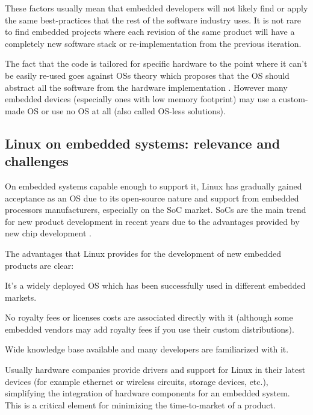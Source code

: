 These factors usually mean that embedded developers will not likely find or apply the same best-practices that the rest of the software industry uses. It is not rare to find embedded projects where each revision of the same product will have a completely new software stack or re-implementation from the previous iteration.

The fact that the code is tailored for specific hardware to the point where it can't be easily re-used goes against \acp{OS} theory which proposes that the \ac{OS} should abstract all the software from the hardware implementation \citep[p.~29]{Silberschatz:2010vn}. However many embedded devices (especially ones with low memory footprint) may use a custom-made \ac{OS} or use no \ac{OS} at all (also called \ac{OS}-less solutions).

\subsection{Linux on embedded systems: relevance and challenges}
On embedded systems capable enough to support it, Linux has gradually gained acceptance as an \ac{OS} due to its open-source nature and support from embedded processors manufacturers, especially on the \ac{SoC} market. \acp{SoC} are the main trend for new product development in recent years due to the advantages provided by new chip development \citep{Somaya:2000fk}.

The advantages that Linux provides for the development of new embedded products  are clear:
\begin{itemize*}
\item It's a widely deployed \ac{OS} which has been successfully used in different embedded markets.
\item No royalty fees or licenses costs are associated directly with it (although some embedded vendors may add royalty fees if you use their custom distributions).
\item Wide knowledge base available and many developers are familiarized with it.
\item Usually hardware companies provide drivers and support for Linux in their latest devices (for example ethernet or wireless circuits, storage devices, etc.), simplifying the integration of hardware components for an embedded system. This is a critical element for minimizing the time-to-market of a product.
\end{itemize*}

